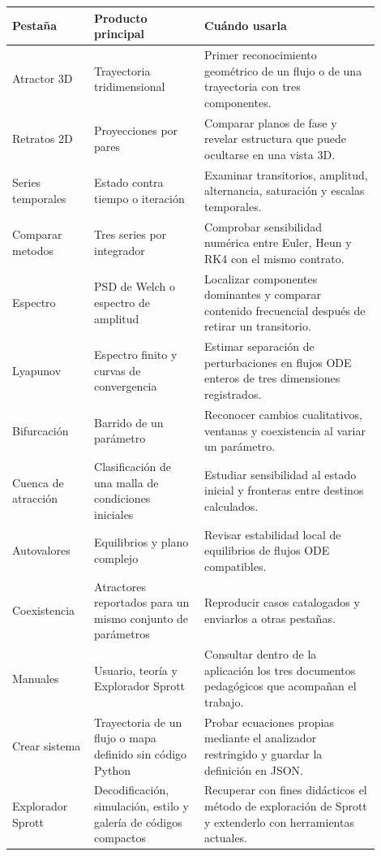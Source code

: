 \documentclass[11pt]{article}
\newcommand{\campo}[1]{\textsf{#1}}
\begin{document}
\begin{longtable}{>{\raggedright\arraybackslash}p{0.20\linewidth}>{\raggedright\arraybackslash}p{0.27\linewidth}>{\raggedright\arraybackslash}p{0.43\linewidth}}
\toprule
Pestaña & Producto principal & Cuándo usarla \\
\midrule
\endhead
\campo{Atractor 3D} & Trayectoria tridimensional & Primer reconocimiento geométrico de un flujo o de una trayectoria con tres componentes. \\
\campo{Retratos 2D} & Proyecciones por pares & Comparar planos de fase y revelar estructura que puede ocultarse en una vista 3D. \\
\campo{Series temporales} & Estado contra tiempo o iteración & Examinar transitorios, amplitud, alternancia, saturación y escalas temporales. \\
\campo{Comparar metodos} & Tres series por integrador & Comprobar sensibilidad numérica entre Euler, Heun y RK4 con el mismo contrato. \\
\campo{Espectro} & PSD de Welch o espectro de amplitud & Localizar componentes dominantes y comparar contenido frecuencial después de retirar un transitorio. \\
\campo{Lyapunov} & Espectro finito y curvas de convergencia & Estimar separación de perturbaciones en flujos ODE enteros de tres dimensiones registrados. \\
\campo{Bifurcación} & Barrido de un parámetro & Reconocer cambios cualitativos, ventanas y coexistencia al variar un parámetro. \\
\campo{Cuenca de atracción} & Clasificación de una malla de condiciones iniciales & Estudiar sensibilidad al estado inicial y fronteras entre destinos calculados. \\
\campo{Autovalores} & Equilibrios y plano complejo & Revisar estabilidad local de equilibrios de flujos ODE compatibles. \\
\campo{Coexistencia} & Atractores reportados para un mismo conjunto de parámetros & Reproducir casos catalogados y enviarlos a otras pestañas. \\
\campo{Manuales} & Usuario, teoría y Explorador Sprott & Consultar dentro de la aplicación los tres documentos pedagógicos que acompañan el trabajo. \\
\campo{Crear sistema} & Trayectoria de un flujo o mapa definido sin código Python & Probar ecuaciones propias mediante el analizador restringido y guardar la definición en JSON. \\
\campo{Explorador Sprott} & Decodificación, simulación, estilo y galería de códigos compactos & Recuperar con fines didácticos el método de exploración de Sprott y extenderlo con herramientas actuales. \\
\bottomrule
\end{longtable}
\end{document}
